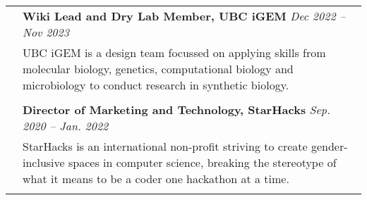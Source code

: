 \documentclass[letterpaper, 11pt]{article}
\begin{document}
\begin{longtable}{p{1.3in}p{4.8in}}
	 & \textbf{Wiki Lead and Dry Lab Member, UBC iGEM} \hfill \textit{Dec 2022 -- Nov 2023}                                                                                                                                                                                                                                                                                                      \\
	 & UBC iGEM is a design team focussed on applying skills from molecular biology, genetics, computational biology and microbiology to conduct research in synthetic biology.                                                                                                                                                                                                                  \\
	 &                                                                                                                                                                                                                                                                                                                                                                                           \\

	 & \textbf{Director of Marketing and Technology, StarHacks} \hfill \textit{Sep. 2020 -- Jan. 2022}                                                                                                                                                                                                                                                                                           \\
	 & StarHacks is an international non-profit striving to create gender-inclusive spaces in computer science, breaking the stereotype of what it means to be a coder one hackathon at a time.                                                                                                                                                                                                  \\
	 &                                                                                                                                                                                                                                                                                                                                                                                           \\


\end{longtable}
\end{document}
